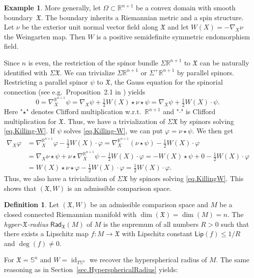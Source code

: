 \documentclass[11pt,reqno]{amsart}
\newcommand{\RadX}{\mathsf{Rad}_{\XX}}
\newcommand{\Lip}{\mathsf{Lip}}
\newcommand{\Sn}{\mathbb{S}^n}
\newcommand{\XX}{\mathfrak{X}}
\newcommand{\R}{\mathbb{R}}
\renewcommand{\phi}{\varphi}
\newcommand{\<}{\langle}
\renewcommand{\>}{\rangle}
\DeclareMathOperator{\id}{\mathrm{id}}
\theoremstyle{definition}
\newtheorem{definition}{Definition}
\newtheorem{example}{Example}
\begin{document}
\begin{example}\label{ex.convexdomain}
More generally, let $\Omega\subset\R^{n+1}$ be a convex domain with smooth boundary~$\XX$.
The boundary inherits a Riemannian metric and a spin structure.
Let $\nu$ be the exterior unit normal vector field along $\XX$ and let $W(X)=-\nabla_X\nu$ the Weingarten map.
Then $W$ is a positive semidefinite symmetric endomorphism field.

Since $n$ is even, the restriction of the spinor bundle $\Sigma\R^{n+1}$ to $\XX$ can be naturally identified with $\Sigma\XX$.
We can trivialize $\Sigma\R^{n+1}$ or $\Sigma^+\R^{n+1}$ by parallel spinors.
Restricting a parallel spinor $\psi$ to $\XX$, the Gauss equation for the spinorial connection (see e.g.\ Proposition~2.1 in \cite{B-harmonic}) yields
$$
0 = \nabla^{\R^{n+1}}_X\psi 
= \nabla_X\psi + \tfrac12 W(X)\star\nu\star\psi 
= \nabla_X\psi + \tfrac12 W(X)\cdot\psi .
$$
Here "$\star$" denotes Clifford multiplication w.r.t.\ $\R^{n+1}$ and "$\cdot$" is Clifford multiplication for $\XX$.
Thus, we have a trivialization of $\Sigma\XX$ by spinors solving \eqref{eq.Killing-W}.
If $\psi$ solves \eqref{eq.Killing-W}, we can put $\phi=\nu\star\psi$.
We then get
\begin{align*}
\nabla_X\phi
&=
\nabla^{\R^{n+1}}_X\phi - \tfrac12 W(X)\cdot\phi 
=
\nabla^{\R^{n+1}}_X(\nu\star\psi) - \tfrac12 W(X)\cdot \phi \\
&=
\nabla_X\nu\star\psi + \nu\star\nabla^{\R^{n+1}}_X\psi - \tfrac12 W(X)\cdot \phi
=
-W(X)\star\psi + 0 - \tfrac12 W(X)\cdot \phi \\
&=
W(X)\star\nu\star\phi - \tfrac12 W(X)\cdot \phi
=
\tfrac12 W(X)\cdot \phi .
\end{align*}
Thus, we also have a trivialization of $\Sigma\XX$ by spinors solving \eqref{eq.KillingW}.
This shows that $(\XX,W)$ is an admissible comparison space.
\end{example}

\begin{definition}\label{def.hyperX}
Let $(\XX,W)$ be an admissible comparison space and $M$ be a closed connected Riemannian manifold with $\dim(\XX)=\dim(M)=n$.
The \emph{hyper-$\XX$-radius} $\RadX(M)$ of $M$ is the supremum of all numbers $R>0$ such that there exists a Lipschitz map $f\colon M\to \XX$ with Lipschitz constant $\Lip(f)\le 1/R$ and $\deg(f)\ne0$.
\end{definition}

For $\XX=\Sn$ and $W=\id_{T\Sn}$ we recover the hyperspherical radius of $M$.
The same reasoning as in Section~\ref{sec.HypersphericalRadius} yields:
\end{document}
